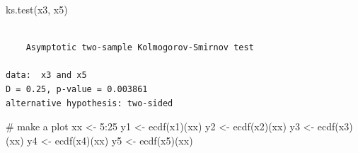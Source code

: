 \documentclass[
  13,
  letterpaper,
]{report}
\newenvironment{Shaded}{\begin{snugshade}}{\end{snugshade}}
\newcommand{\CommentTok}[1]{\textcolor[rgb]{0.37,0.37,0.37}{#1}}
\newcommand{\DecValTok}[1]{\textcolor[rgb]{0.68,0.00,0.00}{#1}}
\newcommand{\FunctionTok}[1]{\textcolor[rgb]{0.28,0.35,0.67}{#1}}
\newcommand{\NormalTok}[1]{\textcolor[rgb]{0.00,0.23,0.31}{#1}}
\newcommand{\OtherTok}[1]{\textcolor[rgb]{0.00,0.23,0.31}{#1}}
\newcommand{\SpecialCharTok}[1]{\textcolor[rgb]{0.37,0.37,0.37}{#1}}
\begin{document}
\begin{Shaded}
\begin{Highlighting}[]
\FunctionTok{ks.test}\NormalTok{(x3, x5)}
\end{Highlighting}
\end{Shaded}

\begin{verbatim}

    Asymptotic two-sample Kolmogorov-Smirnov test

data:  x3 and x5
D = 0.25, p-value = 0.003861
alternative hypothesis: two-sided
\end{verbatim}

\begin{Shaded}
\begin{Highlighting}[]
\CommentTok{\# make a plot}
\NormalTok{xx }\OtherTok{\textless{}{-}} \DecValTok{5}\SpecialCharTok{:}\DecValTok{25}
\NormalTok{y1 }\OtherTok{\textless{}{-}} \FunctionTok{ecdf}\NormalTok{(x1)(xx)}
\NormalTok{y2 }\OtherTok{\textless{}{-}} \FunctionTok{ecdf}\NormalTok{(x2)(xx)}
\NormalTok{y3 }\OtherTok{\textless{}{-}} \FunctionTok{ecdf}\NormalTok{(x3)(xx)}
\NormalTok{y4 }\OtherTok{\textless{}{-}} \FunctionTok{ecdf}\NormalTok{(x4)(xx)}
\NormalTok{y5 }\OtherTok{\textless{}{-}} \FunctionTok{ecdf}\NormalTok{(x5)(xx)}


\end{Highlighting}
\end{Shaded}
\end{document}
